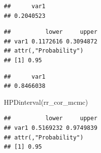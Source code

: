 \documentclass[
  12pt,
]{book}
\newenvironment{Shaded}{\begin{snugshade}}{\end{snugshade}}
\newcommand{\CommentTok}[1]{\textcolor[rgb]{0.56,0.35,0.01}{\textit{#1}}}
\newcommand{\FunctionTok}[1]{\textcolor[rgb]{0.00,0.00,0.00}{#1}}
\newcommand{\NormalTok}[1]{#1}
\newcommand{\OtherTok}[1]{\textcolor[rgb]{0.56,0.35,0.01}{#1}}
\newcommand{\SpecialCharTok}[1]{\textcolor[rgb]{0.00,0.00,0.00}{#1}}
\newcommand{\StringTok}[1]{\textcolor[rgb]{0.31,0.60,0.02}{#1}}
\begin{document}
\begin{Shaded}
\end{Shaded}

\begin{verbatim}
##      var1 
## 0.2040523
\end{verbatim}

\begin{Shaded}
\end{Shaded}

\begin{verbatim}
##          lower     upper
## var1 0.1172616 0.3094872
## attr(,"Probability")
## [1] 0.95
\end{verbatim}

\begin{Shaded}
\end{Shaded}

\begin{verbatim}
##      var1 
## 0.8466038
\end{verbatim}

\begin{Shaded}
\begin{Highlighting}[]
\FunctionTok{HPDinterval}\NormalTok{(rr\_cor\_mcmc)}
\end{Highlighting}
\end{Shaded}

\begin{verbatim}
##          lower     upper
## var1 0.5169232 0.9749839
## attr(,"Probability")
## [1] 0.95
\end{verbatim}
\end{document}

